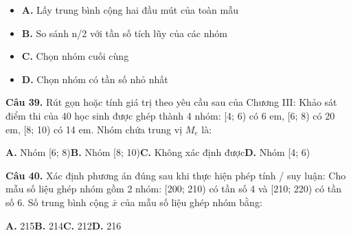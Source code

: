 \documentclass[11pt,a4paper]{article}
\begin{document}
\begin{itemize}\setlength{\itemsep}{1pt}\setlength{\parskip}{0pt}
  \item[] \textbf{A.} Lấy trung bình cộng hai đầu mút của toàn mẫu
  \item[] \textbf{B.} So sánh n/2 với tần số tích lũy của các nhóm
  \item[] \textbf{C.} Chọn nhóm cuối cùng
  \item[] \textbf{D.} Chọn nhóm có tần số nhỏ nhất
\end{itemize}\vspace{2pt}
\textbf{\color{primary} Câu 39.} Rút gọn hoặc tính giá trị theo yêu cầu sau của Chương III: Khảo sát điểm thi của 40 học sinh được ghép thành 4 nhóm: [4; 6) có 6 em, [6; 8) có 20 em, [8; 10) có 14 em. Nhóm chứa trung vị $M_e$ là:\par
\hspace*{1.5em}\textbf{A.} Nhóm [6; 8)\quad\quad \textbf{B.} Nhóm [8; 10)\quad\quad \textbf{C.} Không xác định được\quad\quad \textbf{D.} Nhóm [4; 6)\par\vspace{2pt}
\textbf{\color{primary} Câu 40.} Xác định phương án đúng sau khi thực hiện phép tính / suy luận: Cho mẫu số liệu ghép nhóm gồm 2 nhóm: [200; 210) có tần số 4 và [210; 220) có tần số 6. Số trung bình cộng $\bar{x}$ của mẫu số liệu ghép nhóm bằng:\par
\hspace*{1.5em}\textbf{A.} 215\quad\quad \textbf{B.} 214\quad\quad \textbf{C.} 212\quad\quad \textbf{D.} 216\par\vspace{2pt}
\end{document}
